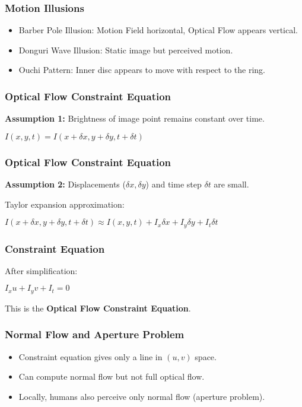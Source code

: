 \begin{frame}
  \frametitle{Motion Illusions}
\begin{itemize}
  \item Barber Pole Illusion: Motion Field horizontal, Optical Flow appears vertical.
  \item Donguri Wave Illusion: Static image but perceived motion.
  \item Ouchi Pattern: Inner disc appears to move with respect to the ring.
\end{itemize}

\vspace{0.5cm}
\centering
\end{frame}

\begin{frame}
  \frametitle{Optical Flow Constraint Equation}
\textbf{Assumption 1:} Brightness of image point remains constant over time.

$ I(x,y,t) = I(x+\delta x, y+\delta y, t+\delta t) $

\vspace{0.5cm}
\centering
\end{frame}

\begin{frame}
  \frametitle{Optical Flow Constraint Equation}
\textbf{Assumption 2:} Displacements ($\delta x, \delta y$) and time step $\delta t$ are small.

Taylor expansion approximation:

$ I(x+\delta x, y+\delta y, t+\delta t) \approx I(x,y,t) + I_x \delta x + I_y \delta y + I_t \delta t $

\end{frame}

\begin{frame}
  \frametitle{Constraint Equation}
After simplification:

$ I_x u + I_y v + I_t = 0 $

This is the \textbf{Optical Flow Constraint Equation}.

\vspace{0.5cm}
\centering
\end{frame}

\begin{frame}
  \frametitle{Normal Flow and Aperture Problem}
\begin{itemize}
  \item Constraint equation gives only a line in $(u,v)$ space.
  \item Can compute normal flow but not full optical flow.
  \item Locally, humans also perceive only normal flow (aperture problem).
\end{itemize}

\vspace{0.5cm}
\centering
\end{frame}

